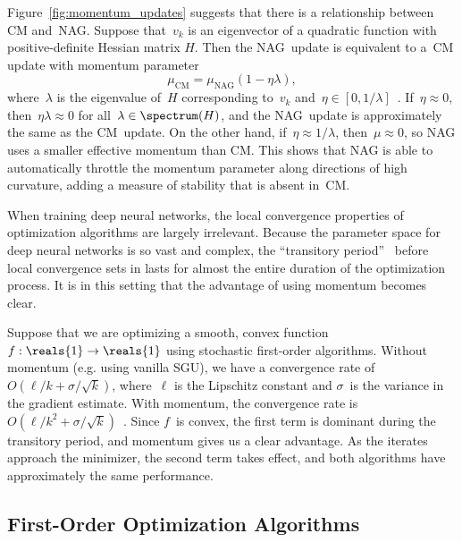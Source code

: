 \documentclass[11pt,a4paper]{article}
\numberwithin{equation}{section}
\begin{document}
Figure~\ref{fig:momentum_updates} suggests that there is a relationship between
CM and~NAG. Suppose that~$v_k$ is an eigenvector of a quadratic function with
positive-definite Hessian matrix $H$. Then the NAG~update is equivalent to a~CM
update with momentum parameter
\[
	\mu_{\text{CM}} = \mu_{\text{NAG}} (1 - \eta \lambda),
\]
where~$\lambda$ is the eigenvalue of~$H$ corresponding to~$v_k$ and~$\eta \in
[0, 1 / \lambda]$~\citep{sutskever2013importance}. If~$\eta \approx 0$,
then~$\eta \lambda \approx 0$ for all~$\lambda \in \spectrum(H)$, and the
NAG~update is approximately the same as the CM~update. On the other hand,
if~$\eta \approx 1 / \lambda$, then~$\mu \approx 0$, so NAG uses a smaller
effective momentum than CM. This shows that NAG is able to automatically
throttle the momentum parameter along directions of high curvature, adding a
measure of stability that is absent in~CM.

When training deep neural networks, the local convergence properties of
optimization algorithms are largely irrelevant. Because the parameter space for
deep neural networks is so vast and complex, the ``transitory
period''~\citep{sutskever2013importance} before local convergence sets in lasts
for almost the entire duration of the optimization process. It is in this
setting that the advantage of using momentum becomes clear.

Suppose that we are optimizing a smooth, convex function~$f : \reals{1} \to
\reals{1}$ using stochastic first-order algorithms. Without momentum (e.g. using
vanilla SGU), we have a convergence rate of~$O(\ell / k + \sigma / \sqrt{k})$,
where~$\ell$ is the Lipschitz constant and $\sigma$~is the variance in the
gradient estimate.  With momentum, the convergence rate is~$O(\ell / k^2 +
\sigma / \sqrt{k})$~\citep{sutskever2013importance}. Since $f$~is convex, the
first term is dominant during the transitory period, and momentum gives us a
clear advantage. As the iterates approach the minimizer, the second term takes
effect, and both algorithms have approximately the same performance.

\subsection{First-Order Optimization Algorithms}
\end{document}
